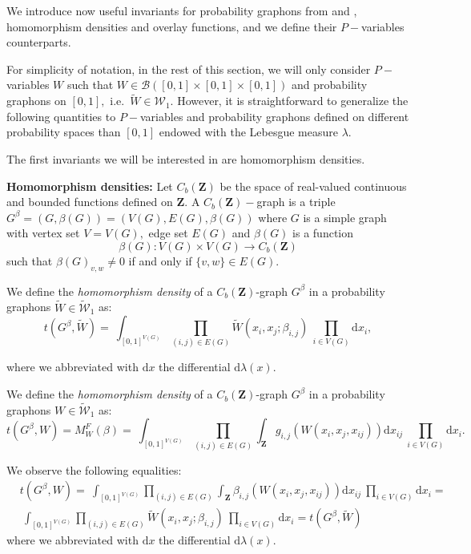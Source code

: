 \documentclass[11pt]{article}
\newcommand{\cB}{{\mathcal B}}  %
\newcommand{\Space}{\mathbf{Z}}
\newcommand{\CbFunct}{C_b(\Space)}
\newcommand{\Graphon}{\mathcal{W}_1}
\newcommand{\UGraphon}{\widetilde{\mathcal{W}}_1}
\newcommand{\drv}{\mathrm{d}}
\begin{document}
We introduce now useful invariants for probability graphons from \cite{abraham2023probabilitygraphons} and \cite{zucal2023action}, homomorphism densities and overlay functions, and we define their $P-$variables counterparts.\newline

For simplicity of notation, in the rest of this section, we will only consider $P-$variables $W$ such that $W\in \cB([0,1]\times [0,1]\times [0,1])$ and probability graphons on $[0,1],$ i.e.\ $\widetilde W\in \Graphon.$ However, it is straightforward to generalize the following quantities to $P-$variables and probability graphons defined on different probability spaces than $[0,1]$ endowed with the Lebesgue measure $\lambda.$

The first invariants we will be interested in are homomorphism densities.

\textbf{Homomorphism densities:}
Let $\CbFunct$ be the space of real-valued continuous and bounded functions defined on $\Space.$ A $\CbFunct-$graph is a triple $G^{\beta}=(G,\beta(G))=(V(G),E(G),\beta(G))$ where $G$ is a simple graph with vertex set $V=V(G),$ edge set $E(G)$ and $\beta(G)$ is a function
$$
\beta(G):V(G)\times V(G)\rightarrow \CbFunct $$
such that $\beta(G)_{v,w}\neq 0$ if and only if $\{v,w\}\in E(G).$

We define the \emph{homomorphism density} of a $\CbFunct$-graph $G^{\beta}$
in a probability graphons $\widetilde{W}\in\UGraphon$ as:
\begin{equation}\label{eq_def_hom_densProbGraph}
t(G^{\beta},\widetilde{W}) = \ \int_{[0,1]^{V(G)}}  \prod_{(i,j)\in E(G)} \widetilde{W}(x_i,x_j; \beta_{i,j})		\	\prod_{i\in V(G)} \drv x_i	 ,
\end{equation}

where we abbreviated with $\drv x$ the differential $\mathrm{d}\lambda( x ).$

We define the \emph{homomorphism density} of a $\CbFunct$-graph $G^{\beta}$
in a probability graphons $W\in\UGraphon$ as:
\begin{equation}\label{eq_def_hom_densPsets}
t(G^{\beta},W) = M_W^F(\beta) 
= \ \int_{[0,1]^{V(G)}}  \prod_{(i,j)\in E(G)} \int_{\Space}g_{i,j}(W(x_i,x_j,x_{ij}) )\drv x_{ij}		\	\prod_{i\in V(G)} \drv x_i	 .
\end{equation}

We observe the following equalities:
\begin{equation*}
\begin{aligned}
     &t(G^{\beta},W)= \ \int_{[0,1]^{V(G)}}  \prod_{(i,j)\in E(G)} \int_{\Space}\beta_{i,j}(W(x_i,x_j,x_{ij}) )\drv x_{ij}		\	\prod_{i\in V(G)} \drv x_i=	\\
& \ \int_{[0,1]^{V(G)}}  \prod_{(i,j)\in E(G)} \widetilde{W}(x_i,x_j; \beta_{i,j})		\	\prod_{i\in V(G)} \drv x_i=t(G^{\beta},\widetilde{W})
     \end{aligned}
   \end{equation*}
where we abbreviated with $\drv x$ the differential $\mathrm{d}\lambda( x ).$
\end{document}
